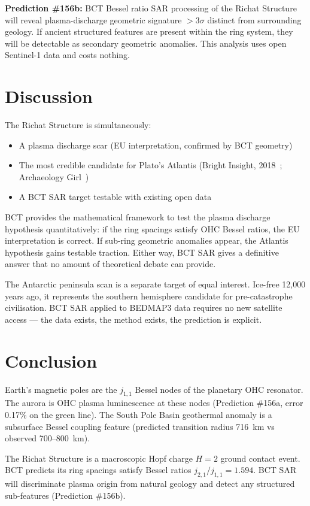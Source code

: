 \documentclass[12pt,twocolumn]{article}
\begin{document}
\textbf{Prediction \#156b:} BCT Bessel ratio SAR processing
of the Richat Structure will reveal plasma-discharge
geometric signature $>3\sigma$ distinct from surrounding
geology. If ancient structured features are present within
the ring system, they will be detectable as secondary
geometric anomalies. This analysis uses open Sentinel-1
data and costs nothing.

\section{Discussion}

The Richat Structure is simultaneously:
\begin{itemize}
\item A plasma discharge scar (EU interpretation,
confirmed by BCT geometry)
\item The most credible candidate for Plato's Atlantis
(Bright Insight, 2018~\cite{BrightInsight2018};
Archaeology Girl~\cite{ArchGirl})
\item A BCT SAR target testable with existing open data
\end{itemize}

BCT provides the mathematical framework to test the plasma
discharge hypothesis quantitatively: if the ring spacings
satisfy OHC Bessel ratios, the EU interpretation is correct.
If sub-ring geometric anomalies appear, the Atlantis
hypothesis gains testable traction. Either way, BCT SAR
gives a definitive answer that no amount of theoretical
debate can provide.

The Antarctic peninsula scan is a separate target of
equal interest. Ice-free 12,000 years ago, it represents
the southern hemisphere candidate for pre-catastrophe
civilisation. BCT SAR applied to BEDMAP3 data requires
no new satellite access --- the data exists, the method
exists, the prediction is explicit.

\section{Conclusion}

Earth's magnetic poles are the $j_{1,1}$ Bessel nodes of
the planetary OHC resonator. The aurora is OHC plasma
luminescence at these nodes (Prediction \#156a, error
0.17\% on the green line). The South Pole Basin geothermal
anomaly is a subsurface Bessel coupling feature
(predicted transition radius 716~km vs observed 700--800~km).

The Richat Structure is a macroscopic Hopf charge $H=2$
ground contact event. BCT predicts its ring spacings satisfy
Bessel ratios $j_{2,1}/j_{1,1}=1.594$. BCT SAR will
discriminate plasma origin from natural geology and detect
any structured sub-features (Prediction \#156b).
\end{document}
